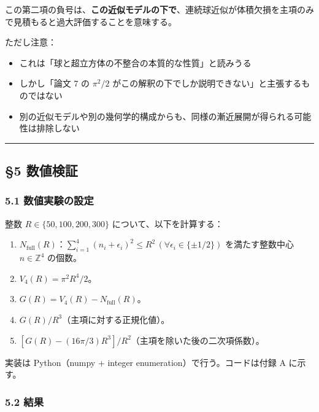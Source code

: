 \documentclass[
]{article}
\providecommand{\tightlist}{%
  \setlength{\itemsep}{0pt}\setlength{\parskip}{0pt}}
\begin{document}
この第二項の負号は、\textbf{この近似モデルの下で}、連続球近似が体積欠損を主項のみで見積もると過大評価することを意味する。

ただし注意：

\begin{itemize}
\tightlist
\item
  これは「球と超立方体の不整合の本質的な性質」と読みうる
\item
  しかし「論文 7 の \(\pi^2/2\)
  がこの解釈の下でしか説明できない」と主張するものではない
\item
  別の近似モデルや別の幾何学的構成からも、同様の漸近展開が得られる可能性は排除しない
\end{itemize}

\begin{center}\rule{0.5\linewidth}{0.5pt}\end{center}

\subsection{§5 数値検証}\label{ux6570ux5024ux691cux8a3c}

\subsubsection{5.1
数値実験の設定}\label{ux6570ux5024ux5b9fux9a13ux306eux8a2dux5b9a}

整数 \(R \in \{50, 100, 200, 300\}\) について、以下を計算する：

\begin{enumerate}
\def\labelenumi{\arabic{enumi}.}
\tightlist
\item
  \(N_{\text{full}}(R)\)：\(\sum_{i=1}^4 (n_i + \epsilon_i)^2 \le R^2 \, (\forall \epsilon_i \in \{\pm 1/2\})\)
  を満たす整数中心 \(n \in \mathbb{Z}^4\) の個数。
\item
  \(V_4(R) = \pi^2 R^4/2\)。
\item
  \(G(R) = V_4(R) - N_{\text{full}}(R)\)。
\item
  \(G(R)/R^3\)（主項に対する正規化値）。
\item
  \([G(R) - (16\pi/3)R^3]/R^2\)（主項を除いた後の二次項係数）。
\end{enumerate}

実装は Python（numpy + integer enumeration）で行う。コードは付録 A
に示す。

\subsubsection{5.2 結果}\label{ux7d50ux679c}
\end{document}
